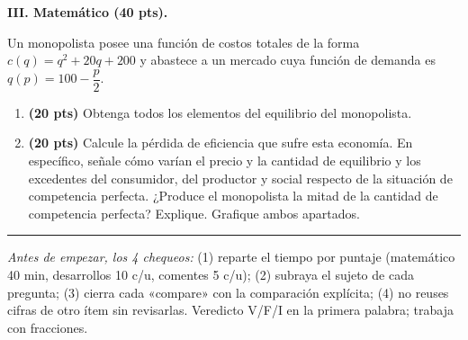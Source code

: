 \documentclass[11pt]{article}
\begin{document}
\textbf{III. Matemático (40 pts).}

Un monopolista posee una función de costos totales de la forma $c(q) = q^{2} + 20q + 200$ y abastece a un mercado cuya función de demanda es $q(p) = 100 - \dfrac{p}{2}$.

\begin{enumerate}[label=\alph*), leftmargin=*, itemsep=8pt]
\item \textbf{(20 pts)} Obtenga todos los elementos del equilibrio del monopolista.

\item \textbf{(20 pts)} Calcule la pérdida de eficiencia que sufre esta economía. En específico, señale cómo varían el precio y la cantidad de equilibrio y los excedentes del consumidor, del productor y social respecto de la situación de competencia perfecta. ¿Produce el monopolista la mitad de la cantidad de competencia perfecta? Explique. Grafique ambos apartados.
\end{enumerate}

\medskip
\hrule
\smallskip
{\small\textit{Antes de empezar, los 4 chequeos:} (1) reparte el tiempo por puntaje (matemático 40 min, desarrollos 10 c/u, comentes 5 c/u); (2) subraya el sujeto de cada pregunta; (3) cierra cada «compare» con la comparación explícita; (4) no reuses cifras de otro ítem sin revisarlas. Veredicto V/F/I en la primera palabra; trabaja con fracciones.}
\end{document}
